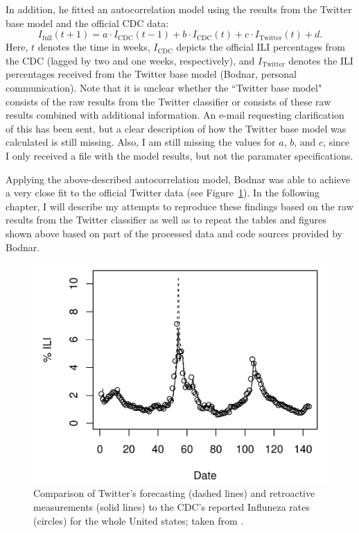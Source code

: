 \documentclass[11pt, a4paper,twoside]{report}\usepackage[]{graphicx}\usepackage[]{color}
\begin{document}
In addition, he fitted an autocorrelation model using the results from the Twitter base model and the official CDC data: 
$$I_{\text{full}}(t + 1) = a \cdot I_{\text{CDC}}(t - 1) + b \cdot I_{\text{CDC}}(t) + c \cdot I_{\text{Twitter}}(t) + d.$$
Here, $t$ denotes the time in weeks, $I_{\text{CDC}}$ depicts the official ILI percentages from the CDC (lagged by two and one weeks, respectively), and $I_{\text{Twitter}}$ denotes the ILI percentages received from the Twitter base model (Bodnar, personal communication). Note that it is unclear whether the ``Twitter base model" consists of the raw results from the Twitter classifier or consists of these raw results combined with additional information. An e-mail requesting clarification of this has been sent, but a clear description of how the Twitter base model was calculated is still missing. Also, I am still missing the values for $a$, $b$, and $c$, since I only received a file with the model results, but not the paramater specifications.

Applying the above-described autocorrelation model, Bodnar was able to achieve a very close fit to the official Twitter data (see Figure~\ref{fig:cdc_fit_bodnar_thesis}). In the following chapter, I will describe my attempts to reproduce these findings based on the raw results from the Twitter classifier as well as to repeat the tables and figures shown above based on part of the processed data and code sources provided by Bodnar. 

\begin{figure}[H]
  \centering
    \includegraphics[width=.9\textwidth]{cdc_fit_bodnar_thesis.png}
  \caption{Comparison of Twitter's forecasting (dashed lines) and retroactive measurements (solid lines) to the CDC's reported Influneza rates (circles) for the whole United states; taken from \cite{bodnar_data_2015}.}
  \label{fig:cdc_fit_bodnar_thesis}
  \end{figure}
\end{document}
